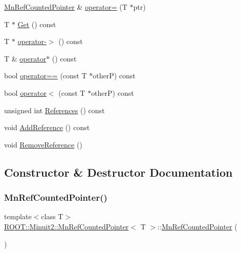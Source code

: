 \begin{DoxyCompactItemize}
\item 
\mbox{\hyperlink{classROOT_1_1Minuit2_1_1MnRefCountedPointer}{Mn\+Ref\+Counted\+Pointer}} \& \mbox{\hyperlink{classROOT_1_1Minuit2_1_1MnRefCountedPointer_a6867125c7f9d76199e7a6676eed5f682}{operator=}} (T $\ast$ptr)
\item 
T $\ast$ \mbox{\hyperlink{classROOT_1_1Minuit2_1_1MnRefCountedPointer_ae88bd272c286587bad6200c41c66909b}{Get}} () const
\item 
T $\ast$ \mbox{\hyperlink{classROOT_1_1Minuit2_1_1MnRefCountedPointer_a9fa09cb52e1c503eb82c3359932eef34}{operator-\/$>$}} () const
\item 
T \& \mbox{\hyperlink{classROOT_1_1Minuit2_1_1MnRefCountedPointer_ab926bb95d092c87afef79bb6c1776bd4}{operator$\ast$}} () const
\item 
bool \mbox{\hyperlink{classROOT_1_1Minuit2_1_1MnRefCountedPointer_a2dbec0c22ef3492abc24cdaa885fd26e}{operator==}} (const T $\ast$otherP) const
\item 
bool \mbox{\hyperlink{classROOT_1_1Minuit2_1_1MnRefCountedPointer_a5927f1f650da34bb024a31e18119ed1e}{operator$<$}} (const T $\ast$otherP) const
\item 
unsigned int \mbox{\hyperlink{classROOT_1_1Minuit2_1_1MnRefCountedPointer_acffac58848d817d7747631954daf3e0c}{References}} () const
\item 
void \mbox{\hyperlink{classROOT_1_1Minuit2_1_1MnRefCountedPointer_a9a8d01a9009e9a9b272c14e46cbeb4d5}{Add\+Reference}} () const
\item 
void \mbox{\hyperlink{classROOT_1_1Minuit2_1_1MnRefCountedPointer_a8e348ffb51b9ed7793cce28e6330309f}{Remove\+Reference}} ()
\end{DoxyCompactItemize}


\subsection{Constructor \& Destructor Documentation}
\mbox{\label{classROOT_1_1Minuit2_1_1MnRefCountedPointer_ab597b297b8bc186cf67a2c6874c2d169}} 
\subsubsection{\texorpdfstring{MnRefCountedPointer()}{MnRefCountedPointer()}\hspace{0.1cm}{\footnotesize\ttfamily [1/6]}}
{\footnotesize\ttfamily template$<$class T$>$ \\
\mbox{\hyperlink{classROOT_1_1Minuit2_1_1MnRefCountedPointer}{R\+O\+O\+T\+::\+Minuit2\+::\+Mn\+Ref\+Counted\+Pointer}}$<$ T $>$\+::\mbox{\hyperlink{classROOT_1_1Minuit2_1_1MnRefCountedPointer}{Mn\+Ref\+Counted\+Pointer}} (\begin{DoxyParamCaption}{ }\end{DoxyParamCaption})\hspace{0.3cm}{\ttfamily [inline]}}

